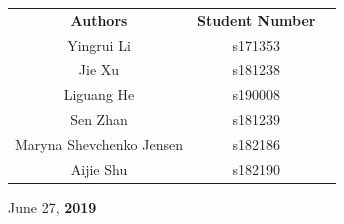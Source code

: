 \begin{titlepage}



\begin{table}[H]
\centering
\begin{tabular}{ccc}
\textbf{Authors} & \textbf{Student Number} \\
Yingrui Li   & s171353     \\

Jie Xu       & s181238    \\               

Liguang He  & s190008       \\ 
Sen Zhan & s181239 & \\

Maryna Shevchenko Jensen             & s182186    \\

Aijie Shu            & s182190     \\
\end{tabular}
\end{table}










\vfill %
\centering June 27, \textbf{2019}
\end{titlepage} 